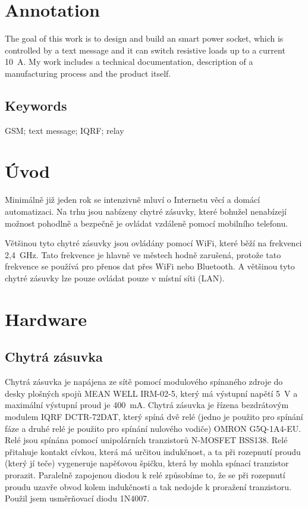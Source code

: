 \documentclass[12pt,a4paper,oneside]{article}
\begin{document}
\section*{Annotation}

The goal of this work is to design and build an smart power socket, which is controlled  by a  text message and it can switch resistive loads up to a current 10~A. My work includes a technical documentation, description of a manufacturing process and the product itself.

\subsection*{Keywords}

GSM; text message; IQRF; relay

\newpage

\tableofcontents

\newpage

\section*{Úvod}


Minimálně již jeden rok se intenzivně mluví o Internetu věcí a domácí automatizaci. Na trhu jsou nabízeny chytré zásuvky, které bohužel nenabízejí možnost pohodlně a bezpečně je ovládat vzdáleně pomocí mobilního telefonu.

Většinou tyto chytré zásuvky jsou ovládány pomocí WiFi, které běží na frekvenci 2,4~GHz. Tato frekvence je hlavně ve městech hodně zarušená, protože tato frekvence se používá pro přenos dat přes WiFi nebo Bluetooth\cite{wiki-ism-band}. A většinou tyto chytré zásuvky lze pouze ovládat pouze v místní síti (LAN).

\newpage

\section{Hardware}

\subsection{Chytrá zásuvka}

Chytrá zásuvka je napájena ze sítě pomocí modulového spínaného zdroje do desky plošných spojů MEAN WELL IRM-02-5, který má výstupní napětí 5~V a maximální výstupní proud je 400~mA. Chytrá zásuvka je řízena bezdrátovým modulem IQRF DCTR-72DAT, který spíná dvě relé (jedno je použito pro spínání fáze a druhé relé je použito pro spínání nulového vodiče) OMRON G5Q-1A4-EU. Relé jsou spínána pomocí unipolárních tranzistorů N-MOSFET BSS138. Relé přitahuje kontakt cívkou, která má určitou indukčnost, a ta při rozepnutí proudu (který jí teče) vygeneruje napěťovou špičku, která by mohla spínací tranzistor prorazit. Paralelně zapojenou diodou k relé způsobíme to, že se při rozepnutí proudu uzavře obvod kolem indukčnosti a tak nedojde k proražení tranzistoru. Použil jsem usměrňovací diodu 1N4007.
\end{document}

